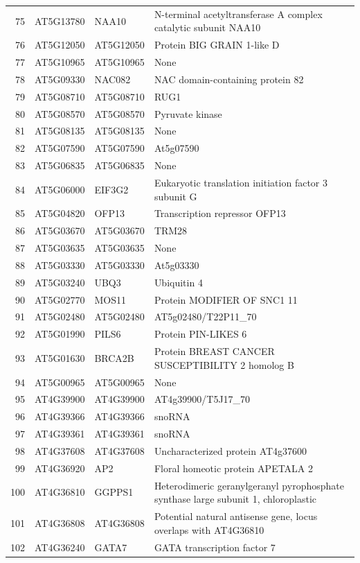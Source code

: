 \documentclass[11pt]{article}
\begin{document}
\begin{center}
\begin{tabular}{rlll}
75 & AT5G13780 & NAA10 & N-terminal acetyltransferase A complex catalytic subunit NAA10\\
76 & AT5G12050 & AT5G12050 & Protein BIG GRAIN 1-like D\\
77 & AT5G10965 & AT5G10965 & None\\
78 & AT5G09330 & NAC082 & NAC domain-containing protein 82\\
79 & AT5G08710 & AT5G08710 & RUG1\\
80 & AT5G08570 & AT5G08570 & Pyruvate kinase\\
81 & AT5G08135 & AT5G08135 & None\\
82 & AT5G07590 & AT5G07590 & At5g07590\\
83 & AT5G06835 & AT5G06835 & None\\
84 & AT5G06000 & EIF3G2 & Eukaryotic translation initiation factor 3 subunit G\\
85 & AT5G04820 & OFP13 & Transcription repressor OFP13\\
86 & AT5G03670 & AT5G03670 & TRM28\\
87 & AT5G03635 & AT5G03635 & None\\
88 & AT5G03330 & AT5G03330 & At5g03330\\
89 & AT5G03240 & UBQ3 & Ubiquitin 4\\
90 & AT5G02770 & MOS11 & Protein MODIFIER OF SNC1 11\\
91 & AT5G02480 & AT5G02480 & AT5g02480/T22P11\_70\\
92 & AT5G01990 & PILS6 & Protein PIN-LIKES 6\\
93 & AT5G01630 & BRCA2B & Protein BREAST CANCER SUSCEPTIBILITY 2 homolog B\\
94 & AT5G00965 & AT5G00965 & None\\
95 & AT4G39900 & AT4G39900 & AT4g39900/T5J17\_70\\
96 & AT4G39366 & AT4G39366 & snoRNA\\
97 & AT4G39361 & AT4G39361 & snoRNA\\
98 & AT4G37608 & AT4G37608 & Uncharacterized protein AT4g37600\\
99 & AT4G36920 & AP2 & Floral homeotic protein APETALA 2\\
100 & AT4G36810 & GGPPS1 & Heterodimeric geranylgeranyl pyrophosphate synthase large subunit 1, chloroplastic\\
101 & AT4G36808 & AT4G36808 & Potential natural antisense gene, locus overlaps with AT4G36810\\
102 & AT4G36240 & GATA7 & GATA transcription factor 7\\

\end{tabular}
\end{center}
\end{document}
